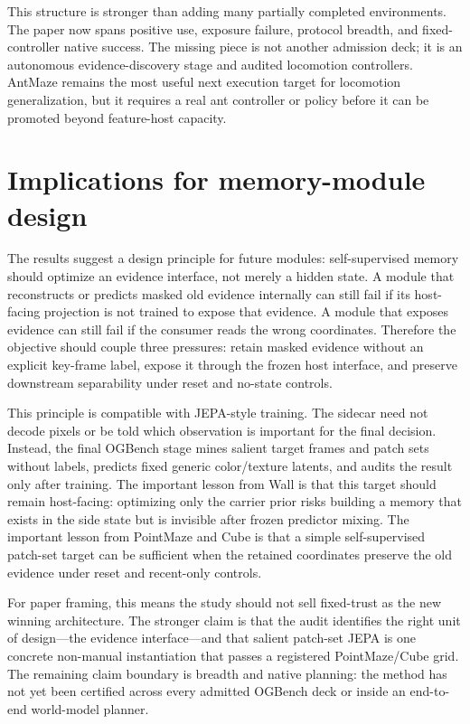 This structure is stronger than adding many partially completed environments.
The paper now spans positive use, exposure failure, protocol breadth, and
fixed-controller native success.  The missing piece is not another admission
deck; it is an autonomous evidence-discovery stage and audited locomotion
controllers.  AntMaze remains the most useful next execution target for
locomotion generalization, but it requires a real ant controller or policy
before it can be promoted beyond feature-host capacity.

\section{Implications for memory-module design}

The results suggest a design principle for future modules: self-supervised
memory should optimize an evidence interface, not merely a hidden state.  A
module that reconstructs or predicts masked old evidence internally can still
fail if its host-facing projection is not trained to expose that evidence.  A
module that exposes evidence can still fail if the consumer reads the wrong
coordinates.  Therefore the objective should couple three pressures: retain
masked evidence without an explicit key-frame label, expose it through the
frozen host interface, and preserve downstream separability under reset and
no-state controls.

This principle is compatible with JEPA-style training.  The sidecar need not
decode pixels or be told which observation is important for the final decision.
Instead, the final OGBench stage mines salient target frames and patch sets
without labels, predicts fixed generic color/texture latents, and audits the
result only after training.  The important lesson from Wall is that this target
should remain host-facing: optimizing only the carrier prior risks building a
memory that exists in the side state but is invisible after frozen predictor
mixing.  The important lesson from PointMaze and Cube is that a simple
self-supervised patch-set target can be sufficient when the retained
coordinates preserve the old evidence under reset and recent-only controls.

For paper framing, this means the study should not sell fixed-trust as the
new winning architecture.  The stronger claim is that the audit identifies the
right unit of design---the evidence interface---and that salient patch-set
JEPA is one concrete non-manual instantiation that passes a registered
PointMaze/Cube grid.  The remaining claim boundary is breadth and native
planning: the method has not yet been certified across every admitted OGBench
deck or inside an end-to-end world-model planner.

